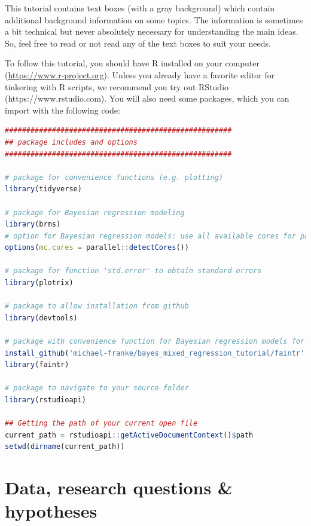 \documentclass[nobib]{tufte-handout}
\begin{document}
This tutorial contains text boxes (with a gray background) which contain additional background information on some topics.
The information is sometimes a bit technical but never absolutely necessary for understanding the main ideas.
So, feel free to read or not read any of the text boxes to suit your needs.

To follow this tutorial, you should have R installed on your computer (\url{https://www.r-project.org}).
Unless you already have a favorite editor for tinkering with R scripts, we recommend you try out RStudio (https://www.rstudio.com).
You will also need some packages,
which you can import with the following code:

\begin{minipage}[]{\textwidth}
\begin{lstlisting}[language=R]
#####################################################
## package includes and options
#####################################################

# package for convenience functions (e.g. plotting)
library(tidyverse)

# package for Bayesian regression modeling
library(brms)
# option for Bayesian regression models: use all available cores for parallel computing
options(mc.cores = parallel::detectCores())

# package for function 'std.error' to obtain standard errors
library(plotrix)

# package to allow installation from github
library(devtools)

# package with convenience function for Bayesian regression models for factorial designs
install_github('michael-franke/bayes_mixed_regression_tutorial/faintr') # install from GitHub
library(faintr)

# package to navigate to your source folder
library(rstudioapi)

## Getting the path of your current open file
current_path = rstudioapi::getActiveDocumentContext()$path 
setwd(dirname(current_path))
\end{lstlisting}
\end{minipage}

\section{Data, research questions \& hypotheses}
\label{sec:data}
\end{document}
